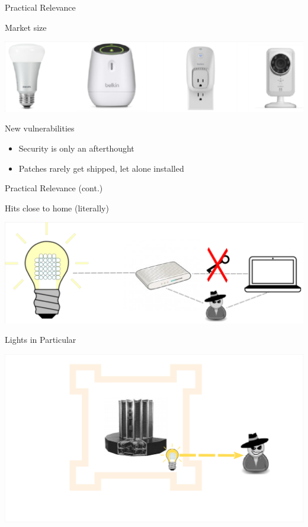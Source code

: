 \documentclass[11pt,t,usepdftitle=false,aspectratio=169]{beamer}
\begin{document}
\begin{frame}{Practical Relevance}
	\begin{block}{Market size}
	   \begin{center}
		    \includegraphics{img/MarketSize.png}
	   \end{center}
	\end{block}
	\begin{block}{New vulnerabilities}
	   \begin{itemize}
	       \item Security is only an afterthought
	       \item Patches rarely get shipped, let alone installed
	   \end{itemize}
	\end{block}	
\end{frame}

\begin{frame}{Practical Relevance (cont.)}
	\begin{block}{Hits close to home (literally)}
	   \begin{center}
		    \includegraphics{img/HomeSec.png}
	   \end{center}
	\end{block}
\end{frame}


\begin{frame}{Lights in Particular}
	\begin{center}
        \includegraphics{img/DatacenterIoT.png}
    \end{center}
\end{frame}
\end{document}
